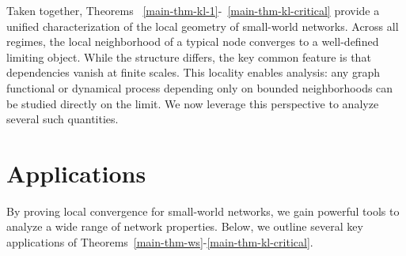 \documentclass[10pt]{amsart}
\newtheorem{corollary}[theorem]{Corollary}
\begin{document}
Taken together, Theorems ~\ref{main-thm-kl-1}-~\ref{main-thm-kl-critical} provide a unified characterization of the local geometry of small-world networks.  Across all regimes, the local neighborhood of a typical node converges to a well-defined limiting object. While the structure differs, the key common feature is that dependencies vanish at finite scales. This locality enables analysis: any graph functional or dynamical process depending only on bounded neighborhoods can be studied directly on the limit. We now leverage this perspective to analyze several such quantities.

\section{Applications}\label{sec-algorithmic-app}
By proving local convergence for small-world networks, we gain powerful tools to analyze a wide range of network properties. Below, we outline several key applications of Theorems~\ref{main-thm-ws}-\ref{main-thm-kl-critical}. 


\end{document}

